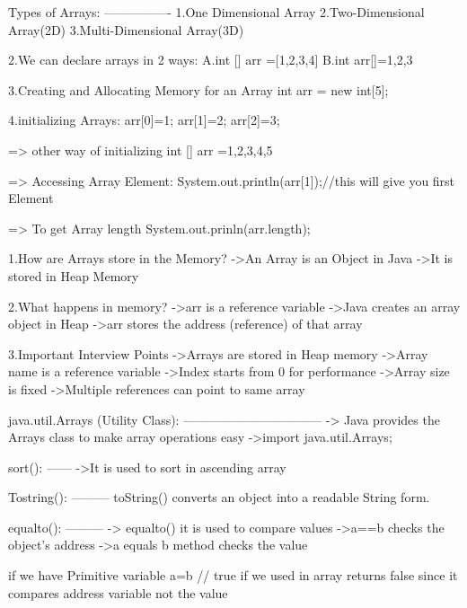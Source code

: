    Types of Arrays:
   ----------------
                  1.One Dimensional Array
                  2.Two-Dimensional Array(2D)
                  3.Multi-Dimensional Array(3D)


   2.We can declare arrays in 2 ways:
         A.int [] arr =[1,2,3,4]
         B.int arr[]={1,2,3}

   3.Creating and Allocating Memory for an Array
        int arr = new int[5];
   
   4.initializing Arrays:
       arr[0]=1;
       arr[1]=2;
       arr[2]=3;

    => other way of initializing
       int [] arr ={1,2,3,4,5}

    => Accessing Array Element:
       System.out.println(arr[1]);//this will give you first Element
      
    => To get Array length
       System.out.prinln(arr.length);



1.How are Arrays store in the Memory?
->An Array is an Object in Java
->It is stored in Heap Memory

2.What happens in memory?
->arr is a reference variable
->Java creates an array object in Heap
->arr stores the address (reference) of that array

3.Important Interview Points 
->Arrays are stored in Heap memory
->Array name is a reference variable
->Index starts from 0 for performance
->Array size is fixed
->Multiple references can point to same array


java.util.Arrays (Utility Class):
---------------------------------
                    -> Java provides the Arrays class to make array operations easy
                    ->import java.util.Arrays;

               sort():
               ------
                    ->It is used to sort in ascending array
                    
               Tostring():
               ---------
                    toString() converts an object into a readable String form.

               equalto():
               ---------
                     -> equalto() it is used to compare values
                     ->a==b checks the object's address
                     ->a equals b method checks the value


            if we have Primitive variable 
            a=b // true
            if we used in array  returns false since it compares address variable not the value


